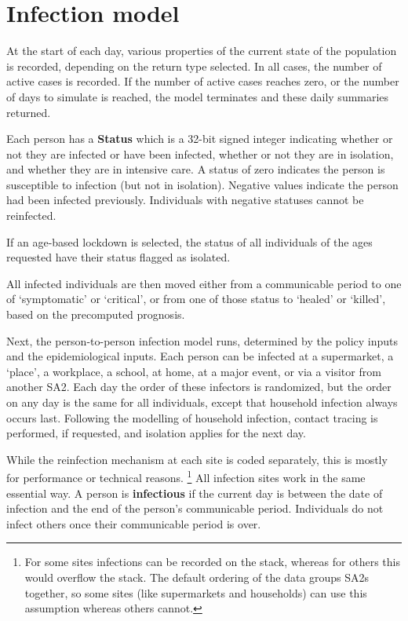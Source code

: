 \documentclass[submission]{grattan}
\newcommand*{\defi}[1]{\textbf{#1}}
\begin{document}
\section{Infection model}

At the start of each day, various properties of the current state of the population is recorded,
depending on the return type selected. In all cases, the number of active cases is recorded.
If the number of active cases reaches zero, or the number of days to simulate is reached, the model
 terminates and these daily summaries returned.

Each person has a \textbf{Status} which is a 32-bit signed integer indicating whether or not
they are infected or have been infected, whether or not they are in isolation, and whether they are
in intensive care. A status of zero indicates the person is susceptible to infection (but not
in isolation). Negative values indicate the person had been infected previously. Individuals with
negative statuses cannot be reinfected.

If an age-based lockdown is selected, the status of  all individuals of the ages requested have their
status flagged as isolated.

All infected individuals are then moved either from a communicable period to one of
`symptomatic' or `critical', or from one of those status to `healed' or `killed', based
on the precomputed prognosis.

Next, the person-to-person infection model runs, determined by the policy inputs and
the epidemiological inputs. Each person can be infected at a supermarket, a `place',
a workplace, a school, at home, at a major event, or via a visitor from another SA2. Each day
the order of these infectors is randomized, but the order on any day is the same for
all individuals, except that household infection always
occurs last. Following the modelling of household infection, contact tracing is performed,
if requested, and isolation applies for the next day.

While the reinfection mechanism at each site is coded separately, this is mostly for
performance or technical reasons.%
	\footnote{For some sites infections can be recorded on the stack, whereas for others this would
	overflow the stack. The default ordering of the data groups SA2s together, so some sites
	(like supermarkets and households) can use this assumption whereas others cannot.}
All infection sites work in the same essential way. 
A person is \defi{infectious} if the current day is between the date of infection and the
end of the person's communicable period. 
Individuals do not infect others once their communicable period is over.
\end{document}
